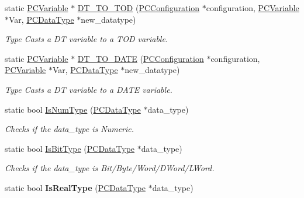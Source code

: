 \begin{DoxyCompactItemize}
\item 
static \hyperlink{classpc__emulator_1_1PCVariable}{P\+C\+Variable} $\ast$ \hyperlink{classpc__emulator_1_1Utils_a1752451e7c722a09c92e8e8a3ed5c161}{D\+T\+\_\+\+T\+O\+\_\+\+T\+OD} (\hyperlink{classpc__emulator_1_1PCConfiguration}{P\+C\+Configuration} $\ast$configuration, \hyperlink{classpc__emulator_1_1PCVariable}{P\+C\+Variable} $\ast$Var, \hyperlink{classpc__emulator_1_1PCDataType}{P\+C\+Data\+Type} $\ast$new\+\_\+datatype)
\begin{DoxyCompactList}\small\item\em Type Casts a DT variable to a T\+OD variable. \end{DoxyCompactList}\item 
static \hyperlink{classpc__emulator_1_1PCVariable}{P\+C\+Variable} $\ast$ \hyperlink{classpc__emulator_1_1Utils_abe584b6abe60235ae5745b66f06b0976}{D\+T\+\_\+\+T\+O\+\_\+\+D\+A\+TE} (\hyperlink{classpc__emulator_1_1PCConfiguration}{P\+C\+Configuration} $\ast$configuration, \hyperlink{classpc__emulator_1_1PCVariable}{P\+C\+Variable} $\ast$Var, \hyperlink{classpc__emulator_1_1PCDataType}{P\+C\+Data\+Type} $\ast$new\+\_\+datatype)
\begin{DoxyCompactList}\small\item\em Type Casts a DT variable to a D\+A\+TE variable. \end{DoxyCompactList}\item 
static bool \hyperlink{classpc__emulator_1_1Utils_a6895a5161c5267bba4748a173c92037a}{Is\+Num\+Type} (\hyperlink{classpc__emulator_1_1PCDataType}{P\+C\+Data\+Type} $\ast$data\+\_\+type)\hypertarget{classpc__emulator_1_1Utils_a6895a5161c5267bba4748a173c92037a}{}\label{classpc__emulator_1_1Utils_a6895a5161c5267bba4748a173c92037a}

\begin{DoxyCompactList}\small\item\em Checks if the data\+\_\+type is Numeric. \end{DoxyCompactList}\item 
static bool \hyperlink{classpc__emulator_1_1Utils_a8eaca0348e91221feedffd1b2772b3a6}{Is\+Bit\+Type} (\hyperlink{classpc__emulator_1_1PCDataType}{P\+C\+Data\+Type} $\ast$data\+\_\+type)\hypertarget{classpc__emulator_1_1Utils_a8eaca0348e91221feedffd1b2772b3a6}{}\label{classpc__emulator_1_1Utils_a8eaca0348e91221feedffd1b2772b3a6}

\begin{DoxyCompactList}\small\item\em Checks if the data\+\_\+type is Bit/\+Byte/\+Word/\+D\+Word/\+L\+Word. \end{DoxyCompactList}\item 
static bool {\bfseries Is\+Real\+Type} (\hyperlink{classpc__emulator_1_1PCDataType}{P\+C\+Data\+Type} $\ast$data\+\_\+type)\hypertarget{classpc__emulator_1_1Utils_a869b48efd6df5ed272d3c0914139ec2d}{}\label{classpc__emulator_1_1Utils_a869b48efd6df5ed272d3c0914139ec2d}


\end{DoxyCompactItemize}
